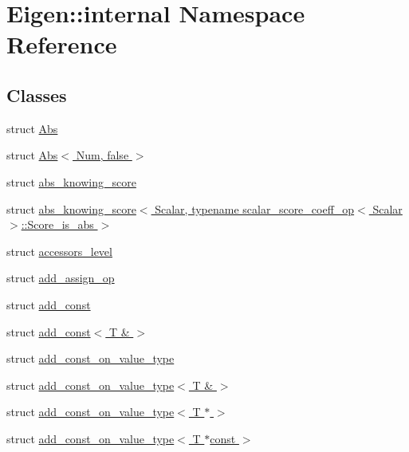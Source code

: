\hypertarget{namespace_eigen_1_1internal}{}\section{Eigen\+:\+:internal Namespace Reference}
\label{namespace_eigen_1_1internal}
\subsection*{Classes}
\begin{DoxyCompactItemize}
\item 
struct \hyperlink{struct_eigen_1_1internal_1_1_abs}{Abs}
\item 
struct \hyperlink{struct_eigen_1_1internal_1_1_abs_3_01_num_00_01false_01_4}{Abs$<$ Num, false $>$}
\item 
struct \hyperlink{struct_eigen_1_1internal_1_1abs__knowing__score}{abs\+\_\+knowing\+\_\+score}
\item 
struct \hyperlink{struct_eigen_1_1internal_1_1abs__knowing__score_3_01_scalar_00_01typename_01scalar__score__coeff5c3b449f8772ed2666062ac71b9807cd}{abs\+\_\+knowing\+\_\+score$<$ Scalar, typename scalar\+\_\+score\+\_\+coeff\+\_\+op$<$ Scalar $>$\+::\+Score\+\_\+is\+\_\+abs $>$}
\item 
struct \hyperlink{struct_eigen_1_1internal_1_1accessors__level}{accessors\+\_\+level}
\item 
struct \hyperlink{struct_eigen_1_1internal_1_1add__assign__op}{add\+\_\+assign\+\_\+op}
\item 
struct \hyperlink{struct_eigen_1_1internal_1_1add__const}{add\+\_\+const}
\item 
struct \hyperlink{struct_eigen_1_1internal_1_1add__const_3_01_t_01_6_01_4}{add\+\_\+const$<$ T \& $>$}
\item 
struct \hyperlink{struct_eigen_1_1internal_1_1add__const__on__value__type}{add\+\_\+const\+\_\+on\+\_\+value\+\_\+type}
\item 
struct \hyperlink{struct_eigen_1_1internal_1_1add__const__on__value__type_3_01_t_01_6_01_4}{add\+\_\+const\+\_\+on\+\_\+value\+\_\+type$<$ T \& $>$}
\item 
struct \hyperlink{struct_eigen_1_1internal_1_1add__const__on__value__type_3_01_t_01_5_01_4}{add\+\_\+const\+\_\+on\+\_\+value\+\_\+type$<$ T $\ast$ $>$}
\item 
struct \hyperlink{struct_eigen_1_1internal_1_1add__const__on__value__type_3_01_t_01_5const_01_4}{add\+\_\+const\+\_\+on\+\_\+value\+\_\+type$<$ T $\ast$const $>$}

\end{DoxyCompactItemize}
